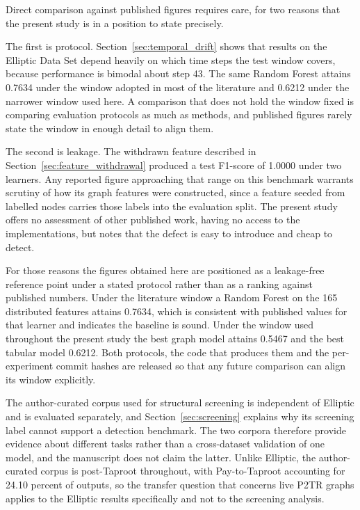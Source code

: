 \documentclass[12pt,a4paper]{article}
\begin{document}
Direct comparison against published figures requires care, for
two reasons that the present study is in a position to state
precisely.

The first is protocol. Section~\ref{sec:temporal_drift} shows
that results on the Elliptic Data Set depend heavily on which
time steps the test window covers, because performance is
bimodal about step 43. The same Random Forest attains 0.7634
under the window adopted in most of the literature and 0.6212
under the narrower window used here. A comparison that does not
hold the window fixed is comparing evaluation protocols as much
as methods, and published figures rarely state the window in
enough detail to align them.

The second is leakage. The withdrawn feature described in
Section~\ref{sec:feature_withdrawal} produced a test F1-score of
1.0000 under two learners. Any reported figure approaching that
range on this benchmark warrants scrutiny of how its graph
features were constructed, since a feature seeded from labelled
nodes carries those labels into the evaluation split. The present
study offers no assessment of other published work, having no
access to the implementations, but notes that the defect is easy
to introduce and cheap to detect.

For those reasons the figures obtained here are positioned as a
leakage-free reference point under a stated protocol rather than
as a ranking against published numbers. Under the literature
window a Random Forest on the 165 distributed features attains
0.7634, which is consistent with published values for that
learner and indicates the baseline is sound. Under the window
used throughout the present study the best graph model attains
0.5467 and the best tabular model 0.6212. Both protocols, the
code that produces them and the per-experiment commit hashes are
released so that any future comparison can align its window
explicitly.

The author-curated corpus used for structural screening is
independent of Elliptic and is evaluated separately, and
Section~\ref{sec:screening} explains why its screening label
cannot support a detection benchmark. The two corpora therefore
provide evidence about different tasks rather than a
cross-dataset validation of one model, and the manuscript does
not claim the latter. Unlike Elliptic, the author-curated corpus
is post-Taproot throughout, with Pay-to-Taproot accounting for
24.10 percent of outputs, so the transfer question that concerns
live P2TR graphs applies to the Elliptic results specifically and
not to the screening analysis.
\end{document}

